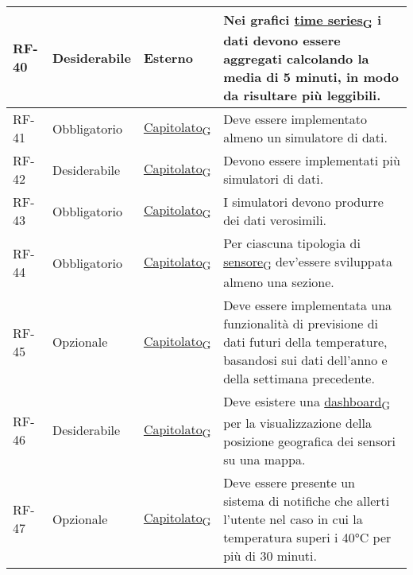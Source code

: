 \begin{longtable}{|>{\centering\arraybackslash}m{}|>{\centering\arraybackslash}m{}|>{\centering\arraybackslash}m{}|>{\centering\arraybackslash}m{}|}
	RF-40           & Desiderabile        & Esterno                                                                                                           & Nei grafici \href{https://7last.github.io/docs/pb/documentazione-interna/glossario\#time-series}{time series\textsubscript{G}} i dati devono essere aggregati calcolando la media di 5 minuti, in modo da risultare più leggibili.
	\\\hline
	RF-41           & Obbligatorio        & \href{https://7last.github.io/docs/pb/documentazione-interna/glossario\#capitolato}{Capitolato\textsubscript{G}} & Deve essere implementato almeno un simulatore di dati.
	\\\hline
	RF-42           & Desiderabile        & \href{https://7last.github.io/docs/pb/documentazione-interna/glossario\#capitolato}{Capitolato\textsubscript{G}} & Devono essere implementati più simulatori di dati.
	\\\hline
	RF-43           & Obbligatorio        & \href{https://7last.github.io/docs/pb/documentazione-interna/glossario\#capitolato}{Capitolato\textsubscript{G}} & I simulatori devono produrre dei dati verosimili.
	\\\hline
	RF-44           & Obbligatorio        & \href{https://7last.github.io/docs/pb/documentazione-interna/glossario\#capitolato}{Capitolato\textsubscript{G}} & Per ciascuna tipologia di \href{https://7last.github.io/docs/pb/documentazione-interna/glossario\#sensore}{sensore\textsubscript{G}} dev'essere sviluppata almeno una sezione.
	\\\hline
	RF-45           & Opzionale           & \href{https://7last.github.io/docs/pb/documentazione-interna/glossario\#capitolato}{Capitolato\textsubscript{G}} & Deve essere implementata una funzionalità di previsione di dati futuri della temperature, basandosi sui dati dell'anno e della settimana precedente.
	\\\hline
	RF-46           & Desiderabile        & \href{https://7last.github.io/docs/pb/documentazione-interna/glossario\#capitolato}{Capitolato\textsubscript{G}} & Deve esistere una \href{https://7last.github.io/docs/pb/documentazione-interna/glossario\#dashboard}{dashboard\textsubscript{G}} per la visualizzazione della posizione geografica dei sensori su una mappa.
	\\\hline
	RF-47           & Opzionale           & \href{https://7last.github.io/docs/pb/documentazione-interna/glossario\#capitolato}{Capitolato\textsubscript{G}} & Deve essere presente un sistema di notifiche che allerti l'utente nel caso in cui la temperatura superi i 40°C per più di 30 minuti.

\end{longtable}
